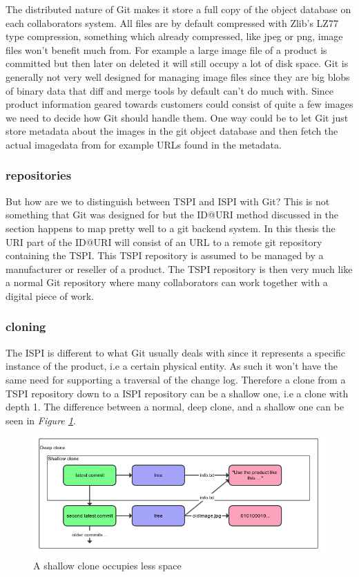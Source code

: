 \documentclass[12pt,a4paper]{article}
\begin{document}
The distributed nature of Git makes it store a full copy of the object database on each collaborators system. All files are by default compressed with Zlib's LZ77 type compression, something which already compressed, like jpeg or png, image files won't benefit much from. For example a large image file of a product is committed but then later on deleted it will still occupy a lot of disk space. Git is generally not very well designed for managing image files since they are big blobs of binary data that diff and merge tools by default can't do much with. Since product information geared towards customers could consist of quite a few images we need to decide how Git should handle them. One way could be to let Git just store metadata about the images in the git object database and then fetch the actual imagedata from for example URLs found in the metadata. 
        
\subsubsection{repositories}
But how are we to distinguish between TSPI and ISPI with Git? This is not something that Git was designed for but the ID@URI method discussed in the  section happens to map pretty well to a git backend system. In this thesis the URI part of the ID@URI will consist of an URL to a remote git repository containing the TSPI. This TSPI repository is assumed to be managed by a manufacturer or reseller of a product. The TSPI repository is then very much like a normal Git repository where many collaborators can work together with a digital piece of work.

\subsubsection{cloning}
The ISPI is different to what Git usually deals with since it represents a specific instance of the product, i.e a certain physical entity. As such it won't have the same need for supporting a traversal of the change log. Therefore a clone from a TSPI repository down to a ISPI repository can be a shallow one, i.e a clone with depth 1. The difference between a normal, deep clone, and a shallow one can be seen in \emph{Figure \ref{fig:shallowclone}}.

\begin{figure}[!ht]
    \centering
    \includegraphics[scale=0.5]{images/shallow.png}
    \caption{A shallow clone occupies less space}
    \label{fig:shallowclone}
\end{figure}
\end{document}
